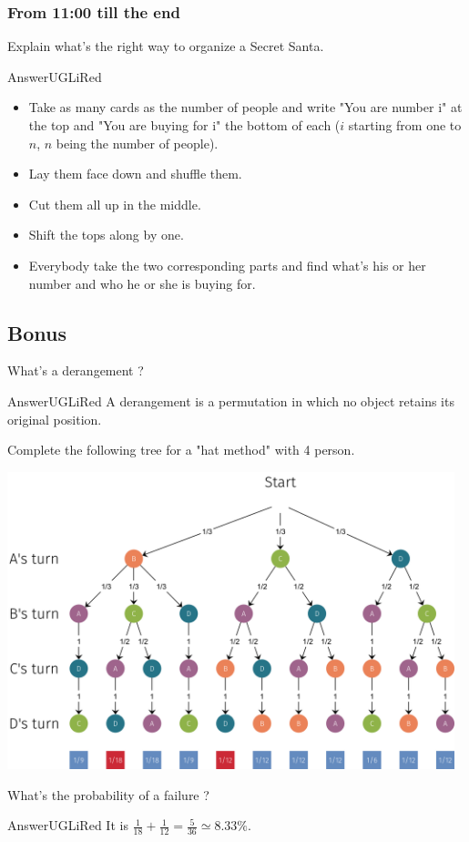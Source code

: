 \documentclass[12pt,a4paper,article,english,firamath]{nsi}
\begin{document}
\subsubsection*{From 11:00 till the end}
Explain what's the right way to organize a Secret Santa.
\begin{encadrecolore}{Answer}{UGLiRed}
\begin{itemize}
    \item Take as many cards as the number of people and write "You are number i" at the top and "You are buying for i" the bottom of each ($i$ starting from one to $n$, $n$ being the number of people). 
    \item Lay them face down and shuffle them.
    \item Cut them all up in the middle.
    \item Shift the tops along by one.
    \item Everybody take the two corresponding parts and find what's his or her number and who he or she is buying for.
\end{itemize}
\end{encadrecolore}
\subsection*{Bonus}

What's a derangement ?
\begin{encadrecolore}{Answer}{UGLiRed}
    A derangement is a permutation in which no object retains its original position.
\end{encadrecolore}

Complete the following tree for a "hat method" with 4 person.
\begin{center}
    \includegraphics[width=13cm]{img/tree_santa4_sol.png}
\end{center}
What's the probability of a failure ?
\begin{encadrecolore}{Answer}{UGLiRed}
    It is $\frac{1}{18}+\frac{1}{12}=\frac{5}{36}\simeq 8.33\%$.
\end{encadrecolore}
\end{document}
